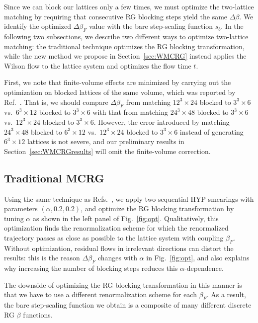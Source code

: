 \documentclass{PoS}
\newcommand{\al}{\ensuremath{\alpha} }
\newcommand{\be}{\ensuremath{\beta} }
\newcommand{\De}{\ensuremath{\Delta} }
\newcommand{\X}{\ensuremath{\!\times\!} }
\newcommand{\refcite}[1]{Ref.~\cite{#1}}
\newcommand{\fig}[1]{Fig.~\ref{#1}}
\newcommand{\secref}[1]{Section~\ref{#1}}
\begin{document}
Since we can block our lattices only a few times, we must optimize the two-lattice matching by requiring that consecutive RG blocking steps yield the same $\De\be$.
We identify the optimized $\De\be_F$ value with the bare step-scaling function $s_b$.
In the following two subsections, we describe two different ways to optimize two-lattice matching: the traditional technique optimizes the RG blocking transformation, while the new method we propose in \secref{sec:WMCRG} instead applies the Wilson flow to the lattice system and optimizes the flow time $t$.

First, we note that finite-volume effects are minimized by carrying out the optimization on blocked lattices of the same volume, which was reported by \refcite{Hasenfratz:2011xn}.
That is, we should compare $\De\be_F$ from matching $12^3\X24$ blocked to $3^3\X6$ vs.\ $6^3\X12$ blocked to $3^3\X6$ with that from matching $24^3\X48$ blocked to $3^3\X6$ vs.\ $12^3\X24$ blocked to $3^3\X6$.
However, the error introduced by matching $24^3\X48$ blocked to $6^3\X12$ vs.\ $12^3\X24$ blocked to $3^3\X6$ instead of generating $6^3\X12$ lattices is not severe, and our preliminary results in \secref{sec:WMCRGresults} will omit the finite-volume correction.



\subsection{Traditional MCRG} %
Using the same technique as Refs.~\cite{Hasenfratz:2011xn, Hasenfratz:2011np}, we apply two sequential HYP smearings with parameters $(\al, 0.2, 0.2)$, and optimize the RG blocking transformation by tuning \al as shown in the left panel of \fig{fig:opt}.
Qualitatively, this optimization finds the renormalization scheme for which the renormalized trajectory passes as close as possible to the lattice system with coupling $\be_F$.
Without optimization, residual flows in irrelevant directions can distort the results: this is the reason $\De\be_F$ changes with \al in \fig{fig:opt}, and also explains why increasing the number of blocking steps reduces this $\al$-dependence.

The downside of optimizing the RG blocking transformation in this manner is that we have to use a different renormalization scheme for each $\be_F$.
As a result, the bare step-scaling function we obtain is a composite of many different discrete RG \be functions.
\end{document}
